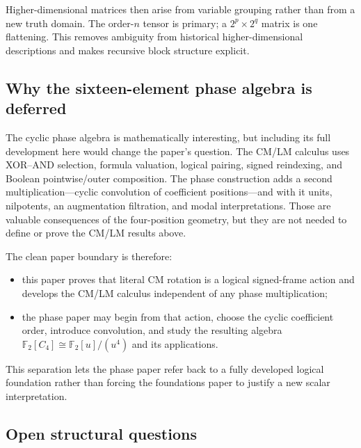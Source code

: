 \documentclass[11pt]{article}
\theoremstyle{definition}
\theoremstyle{remark}
\newcommand{\F}{\mathbb F}
\begin{document}
Higher-dimensional matrices then arise from variable grouping rather than from a new truth domain.  The order-$n$ tensor is primary; a $2^p\times2^q$ matrix is one flattening.  This removes ambiguity from historical higher-dimensional descriptions and makes recursive block structure explicit.

\subsection{Why the sixteen-element phase algebra is deferred}

The cyclic phase algebra is mathematically interesting, but including its full development here would change the paper's question.  The CM/LM calculus uses XOR--AND selection, formula valuation, logical pairing, signed reindexing, and Boolean pointwise/outer composition.  The phase construction adds a second multiplication---cyclic convolution of coefficient positions---and with it units, nilpotents, an augmentation filtration, and modal interpretations.  Those are valuable consequences of the four-position geometry, but they are not needed to define or prove the CM/LM results above.

The clean paper boundary is therefore:
\begin{itemize}
  \item this paper proves that literal CM rotation is a logical signed-frame action and develops the CM/LM calculus independent of any phase multiplication;
  \item the phase paper may begin from that action, choose the cyclic coefficient order, introduce convolution, and study the resulting algebra $\F_2[C_4]\cong\F_2[u]/(u^4)$ and its applications.
\end{itemize}
This separation lets the phase paper refer back to a fully developed logical foundation rather than forcing the foundations paper to justify a new scalar interpretation.

\subsection{Open structural questions}
\end{document}
